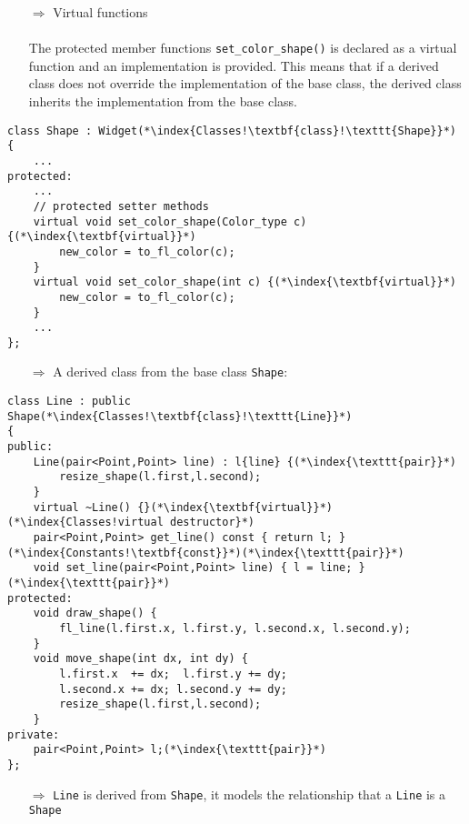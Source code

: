 \documentclass[10pt]{article}
\begin{document}
\begin{enumerate}
\item[$\Rightarrow$] Virtual functions\\ \\ The protected member functions \texttt{set\_color\_shape()} is declared as a virtual function and an implementation is provided. This means that if a derived class does not override the implementation of the base class, the derived class inherits the implementation from the base class.
\end{enumerate}
\begin{lstlisting}
class Shape : Widget(*\index{Classes!\textbf{class}!\texttt{Shape}}*)
{
    ...
protected:
    ...
    // protected setter methods
    virtual void set_color_shape(Color_type c) {(*\index{\textbf{virtual}}*)
        new_color = to_fl_color(c);
    }
    virtual void set_color_shape(int c) {(*\index{\textbf{virtual}}*)
        new_color = to_fl_color(c);
    }
    ...
};
\end{lstlisting}
\begin{enumerate}
\item[$\Rightarrow$] A derived class from the base class \texttt{Shape}:
\end{enumerate}
\begin{lstlisting}
class Line : public Shape(*\index{Classes!\textbf{class}!\texttt{Line}}*)
{
public:
    Line(pair<Point,Point> line) : l{line} {(*\index{\texttt{pair}}*)
        resize_shape(l.first,l.second);
    }
    virtual ~Line() {}(*\index{\textbf{virtual}}*)(*\index{Classes!virtual destructor}*)
    pair<Point,Point> get_line() const { return l; }(*\index{Constants!\textbf{const}}*)(*\index{\texttt{pair}}*)
    void set_line(pair<Point,Point> line) { l = line; }(*\index{\texttt{pair}}*)
protected:
    void draw_shape() {
        fl_line(l.first.x, l.first.y, l.second.x, l.second.y);
    }
    void move_shape(int dx, int dy) {
        l.first.x  += dx;  l.first.y += dy;
        l.second.x += dx; l.second.y += dy;
        resize_shape(l.first,l.second);
    }
private:
    pair<Point,Point> l;(*\index{\texttt{pair}}*)
};
\end{lstlisting}
\begin{enumerate}
\item[$\Rightarrow$] \texttt{Line} is derived from \texttt{Shape}, it models the relationship that a \texttt{Line} is a \texttt{Shape}
\end{enumerate}
\end{document}
